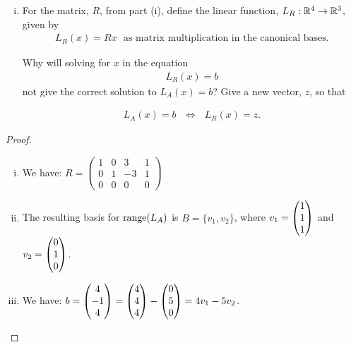 \begin{question}
\begin{enumerate}[(i)]
        \item For the matrix, $R$, from part (i), define the linear function, $L_R:{\mathbb R}^4\to{\mathbb R}^3$, given by
              \begin{align*}
                  L_R(x) = Rx\ \ \ \text{as matrix multiplication in the canonical bases}.
              \end{align*}

              Why will solving for $x$ in the equation
              \begin{align*}
                  L_R(x)=b
              \end{align*}
              not give the correct solution to $L_A(x)=b$?  Give a new vector, $z$, so that

              \begin{align*}
                  L_A(x)=b\ \ \ \iff\ \ \ L_R(x)=z.
              \end{align*}
    \end{enumerate}
\end{question}

\begin{proof}
    \renewcommand{\qedsymbol}{$\blacksquare$}
    \begin{enumerate}[(i)]
        \item We have: $R=\begin{pmatrix}
            1 & 0 & 3 & 1\\
            0 & 1 & -3 & 1\\
            0 & 0 & 0 & 0
        \end{pmatrix}$
        \item The resulting basis for $\textnormal{range}(L_A)$ is $B=\{v_1,v_2\}$, where $v_1=\begin{pmatrix} 1\\ 1\\ 1\end{pmatrix}$ and $v_2=\begin{pmatrix} 0\\ 1\\ 0\end{pmatrix}$.
        \item We have: $b=\begin{pmatrix} 4\\ -1\\ 4\end{pmatrix}=\begin{pmatrix} 4\\ 4\\ 4\end{pmatrix}-\begin{pmatrix} 0\\ 5\\ 0\end{pmatrix}=4v_1-5v_2$.
    \end{enumerate}
\end{proof}
 